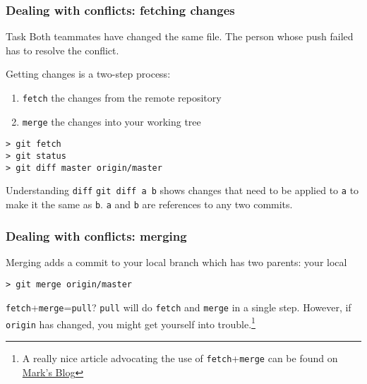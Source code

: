 

\begin{frame}[fragile]
	\frametitle{Dealing with conflicts: fetching changes}

	\begin{block}{Task}
	Both teammates have changed the same file. The person whose push failed has to resolve the conflict.	
	\end{block}
	
	Getting changes is a two-step process:
	\begin{enumerate}
		\item \texttt{fetch} the changes from the remote repository
		\item \texttt{merge} the changes into your working tree
	\end{enumerate}
	
	\begin{verbatim}
> git fetch
> git status
> git diff master origin/master
	\end{verbatim}
	
	\begin{block}{Understanding \texttt{diff}}
	\texttt{git diff a b} shows changes that need to be applied to \texttt{a} to make it the same as \texttt{b}. \texttt{a} and \texttt{b} are references to any two commits.
	\end{block}
	
\end{frame}


\begin{frame}[fragile]
	\frametitle{Dealing with conflicts: merging}
	
	Merging adds a commit to your local branch which has two parents: your local 
	\begin{verbatim}
> git merge origin/master
	\end{verbatim}
	
	\begin{block}{\texttt{fetch}+\texttt{merge}=\texttt{pull}?}
	\texttt{pull} will do \texttt{fetch} and \texttt{merge} in a single step. However, if \texttt{origin} has changed, you might get yourself into trouble.\footnote{A really nice article advocating the use of \texttt{fetch}+\texttt{merge} can be found on \href{http://longair.net/blog/2009/04/16/git-fetch-and-merge/}{Mark's Blog}} 
	\end{block}
	
\end{frame}

